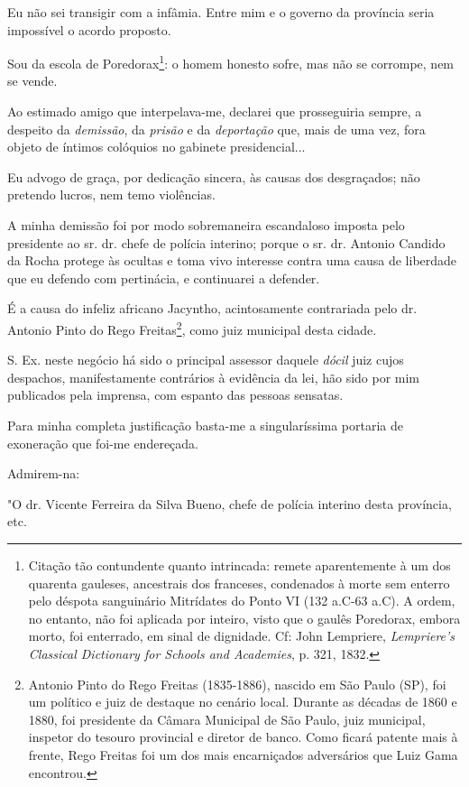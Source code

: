 Eu não sei transigir com a infâmia. Entre mim e o governo da província
seria impossível o acordo proposto.

Sou da escola de Poredorax\footnote{Citação tão contundente quanto
  intrincada: remete aparentemente à um dos quarenta gauleses,
  ancestrais dos franceses, condenados à morte sem enterro pelo déspota
  sanguinário Mitrídates do Ponto VI (132 a.C-63 a.C). A ordem, no
  entanto, não foi aplicada por inteiro, visto que o gaulês Poredorax,
  embora morto, foi enterrado, em sinal de dignidade. Cf: John
  Lempriere, \emph{Lempriere's Classical Dictionary for Schools and
  Academies}, p. 321, 1832.}: o homem honesto sofre, mas não se
corrompe, nem se vende.

Ao estimado amigo que interpelava-me, declarei que prosseguiria sempre,
a despeito da \emph{demissão}, da \emph{prisão} e da \emph{deportação}
que, mais de uma vez, fora objeto de íntimos colóquios no gabinete
presidencial...

Eu advogo de graça, por dedicação sincera, às causas dos desgraçados;
não pretendo lucros, nem temo violências.

A minha demissão foi por modo sobremaneira escandaloso imposta pelo
presidente ao sr. dr. chefe de polícia interino; porque o sr. dr.
Antonio Candido da Rocha protege às ocultas e toma vivo interesse contra
uma causa de liberdade que eu defendo com pertinácia, e continuarei a
defender.

É a causa do infeliz africano Jacyntho, acintosamente contrariada pelo
dr. Antonio Pinto do Rego Freitas\footnote{Antonio Pinto do Rego
  Freitas (1835-1886), nascido em São Paulo (SP), foi um político e juiz
  de destaque no cenário local. Durante as décadas de 1860 e 1880, foi
  presidente da Câmara Municipal de São Paulo, juiz municipal, inspetor
  do tesouro provincial e diretor de banco. Como ficará patente mais à
  frente, Rego Freitas foi um dos mais encarniçados adversários que Luiz
  Gama encontrou.}, como juiz municipal desta cidade.

S. Ex. neste negócio há sido o principal assessor daquele \emph{dócil}
juiz cujos despachos, manifestamente contrários à evidência da lei, hão
sido por mim publicados pela imprensa, com espanto das pessoas sensatas.

Para minha completa justificação basta-me a singularíssima portaria de
exoneração que foi-me endereçada.

Admirem-na:

"O dr. Vicente Ferreira da Silva Bueno, chefe de polícia interino desta
província, etc.

